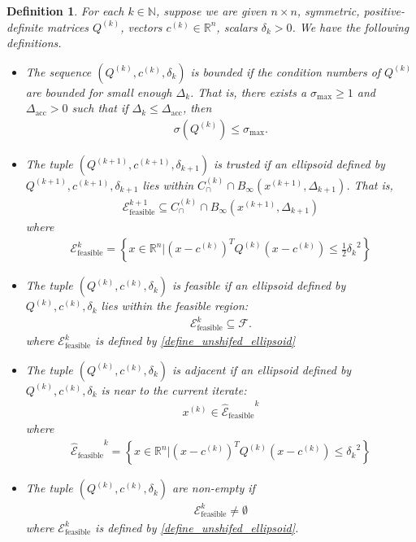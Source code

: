 \documentclass{article}
\newtheorem{definition}[theorem]{Definition}
\theoremstyle{case}
\numberwithin{theorem}{subsection}
\newcommand{\capcones}{{C^{(k)}_{\cap}}}
\newcommand{\ck}{{c^{(k)}}}
\newcommand{\dacc}{{\Delta_{\textrm{acc}}}}
\newcommand{\dk}{\Delta_k}
\newcommand{\dkpo}{\Delta_{k+1}}
\newcommand{\feasible}{{\mathcal F}}
\newcommand{\naturals}{\mathbb N}
\newcommand{\qk}{{Q^{(k)}}}
\newcommand{\Rn}{\mathbb R^n}
\newcommand{\scaledunshiftedellipsoid}{{{\mathcal {\hat E}_{\text{feasible}}}^k}}
\newcommand{\sdk}{{\delta_k}}
\newcommand{\sigmamax}{{\sigma_{\textrm{max}}}}
\newcommand{\trkpo}{{ B_{\infty}\left(\xkpo, \dkpo\right) }}
\newcommand{\unshiftedellipsoid}{{\mathcal E^k_{\textrm{feasible}}}}
\newcommand{\xkpo}{{{x}^{(k+1)}}}
\newcommand{\xk}{x^{(k)}}
\newcommand{\qkpo}{{Q^{(k+1)}}}
\newcommand{\ckpo}{{c^{(k+1)}}}
\newcommand{\sdkpo}{{\delta_{k+1}}}
\newcommand{\unshiftedellipsoidkpo}{{\mathcal E^{k+1}_{\textrm{feasible}}}}
\begin{document}
\begin{definition}
\label{ellipsoids_notation_definitions}
For each $k \in \naturals$, suppose we are given $n\times n$, symmetric, positive-definite matrices $\qk$, vectors $\ck \in \Rn$, scalars $\sdk > 0$.
We have the following definitions.
\begin{itemize}
\item The sequence $(\qk, \ck, \sdk)$ is \emph{bounded} if the condition numbers of $\qk$ are bounded for small enough $\dk$.
That is, there exists a $\sigmamax \ge 1$ and $\dacc > 0$ such that if $\dk \le \dacc$, then
\begin{align}
\sigma\left(Q^{(k)}\right) \le \sigmamax. \label{define_suitable_condition_numbers}
\end{align}
\item The tuple $(\qkpo, \ckpo, \sdkpo)$ is \emph{trusted} if an ellipsoid defined by $\qkpo, \ckpo, \sdkpo$ lies within $ \capcones \cap \trkpo $.
That is,
\begin{align}
\unshiftedellipsoidkpo \subseteq \capcones \cap \trkpo  \label{define_suitable_in_tr}
\end{align}
where
\begin{align}
\unshiftedellipsoid = \left\{x \in \Rn | \left(x - \ck \right)^T \qk \left(x - \ck\right) \le \frac 1 2 {\sdk}^2 \right\} \label{define_unshifed_ellipsoid}
\end{align}
\item The tuple $(\qk, \ck, \sdk)$ is \emph{feasible} if an ellipsoid defined by $\qk, \ck, \sdk$ lies within the feasible region:
\begin{align}
\unshiftedellipsoid \subseteq \feasible.
\end{align}
where $\unshiftedellipsoid$ is defined by \cref{define_unshifed_ellipsoid}
\item The tuple $(\qk, \ck, \sdk)$ is \emph{adjacent} if an ellipsoid defined by $\qk, \ck, \sdk$ is near to the current iterate:
\begin{align}
\xk \in \scaledunshiftedellipsoid \label{define_suitable_close_to_iterate}
\end{align}
where
\begin{align}
\scaledunshiftedellipsoid = \left\{x \in \Rn | \left(x - \ck\right)^T \qk \left(x - \ck\right) \le {\sdk}^2 \right\} \label{define_scaledunshiftedellipsoid}
\end{align}
\item The tuple $(\qk, \ck, \sdk)$ are \emph{non-empty} if
\begin{align}
\unshiftedellipsoid \ne \emptyset
\end{align}
where $\unshiftedellipsoid$ is defined by \cref{define_unshifed_ellipsoid}.
\end{itemize}
\end{definition}
\end{document}
